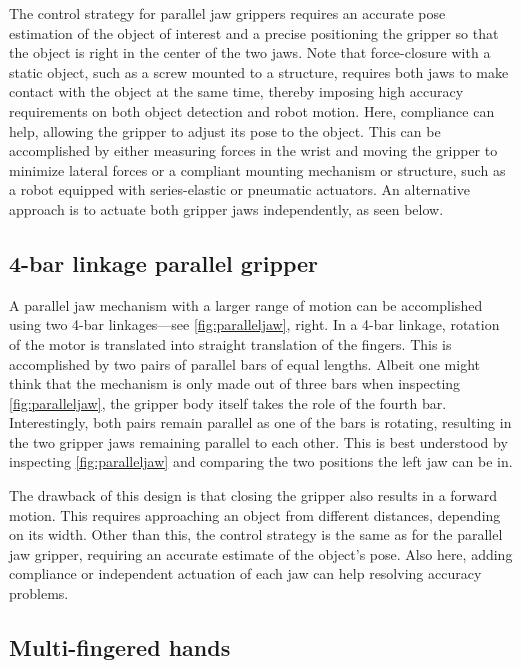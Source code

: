 The control strategy for parallel jaw grippers requires an accurate pose estimation of the object of interest and a precise positioning the gripper so that the object is right in the center of the two jaws. Note that force-closure with a static object, such as a screw mounted to a structure, requires both jaws to make contact with the object at the same time, thereby imposing high accuracy requirements on both object detection and robot motion. Here, compliance can help, allowing the gripper to adjust its pose to the object. This can be accomplished by either measuring forces in the wrist and moving the gripper to minimize lateral forces or a compliant mounting mechanism or structure, such as a robot equipped with series-elastic or pneumatic actuators. An alternative approach is to actuate both gripper jaws independently, as seen below.

\subsection{4-bar linkage parallel gripper}

A parallel jaw mechanism with a larger range of motion can be accomplished using two 4-bar linkages---see \cref{fig:paralleljaw}, right. In a 4-bar linkage, rotation of the motor is translated into straight translation of the fingers. This is accomplished by two pairs of parallel bars of equal lengths. Albeit one might think that the mechanism is only made out of three bars when inspecting \cref{fig:paralleljaw}, the gripper body itself takes the role of the fourth bar. Interestingly, both pairs remain parallel as one of the bars is rotating, resulting in the two gripper jaws remaining parallel to each other. This is best understood by inspecting \cref{fig:paralleljaw} and comparing the two positions the left jaw can be in.

The drawback of this design is that closing the gripper also results in a forward motion. This requires approaching an object from different distances, depending on its width. Other than this, the control strategy is the same as for the parallel jaw gripper, requiring an accurate estimate of the object's pose. Also here, adding compliance or independent actuation of each jaw can help resolving accuracy problems.

\subsection{Multi-fingered hands}

